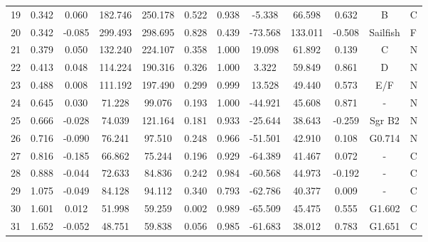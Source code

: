 \begin{table*}
{\begin{tabular}{ccccccccccc}
      19 &  0.342 &  0.060 &  182.746 &  250.178  &  0.522 &  0.938 &   -5.338 &   66.598  &  0.632 & B & C \\
      20 &  0.342 & -0.085 &  299.493 &  298.695  &  0.828 &  0.439 &  -73.568 &  133.011  & -0.508 & Sailfish & F \\
      21 &  0.379 &  0.050 &  132.240 &  224.107  &  0.358 &  1.000 &   19.098 &   61.892  &  0.139 & C & N \\
      22 &  0.413 &  0.048 &  114.224 &  190.316  &  0.326 &  1.000 &    3.322 &   59.849  &  0.861 & D & N \\
      23 &  0.488 &  0.008 &  111.192 &  197.490  &  0.299 &  0.999 &   13.528 &   49.440  &  0.573 & E/F & N \\
      24 &  0.645 &  0.030 &   71.228 &   99.076  &  0.193 &  1.000 &  -44.921 &   45.608  &  0.871 & - & N \\
      25 &  0.666 & -0.028 &   74.039 &  121.164  &  0.181 &  0.933 &  -25.644 &   38.643  & -0.259 & Sgr B2 & N \\
      26 &  0.716 & -0.090 &   76.241 &   97.510  &  0.248 &  0.966 &  -51.501 &   42.910  &  0.108 & G0.714 & N \\
      27 &  0.816 & -0.185 &   66.862 &   75.244  &  0.196 &  0.929 &  -64.389 &   41.467  &  0.072 & - & C \\
      28 &  0.888 & -0.044 &   72.633 &   84.836  &  0.242 &  0.984 &  -60.568 &   44.973  & -0.192 & - & C \\
      29 &  1.075 & -0.049 &   84.128 &   94.112  &  0.340 &  0.793 &  -62.786 &   40.377  &  0.009 & - & C \\
      30 &  1.601 &  0.012 &   51.998 &   59.259  &  0.002 &  0.989 &  -65.509 &   45.475  &  0.555 & G1.602 & C \\
      31 &  1.652 & -0.052 &   48.751 &   59.838  &  0.056 &  0.985 &  -61.683 &   38.012  &  0.783 & G1.651 & C \\
      





\hline
\hline
\end{tabular}%
\label{tab: flux_calc_tab}

}

\end{table*}